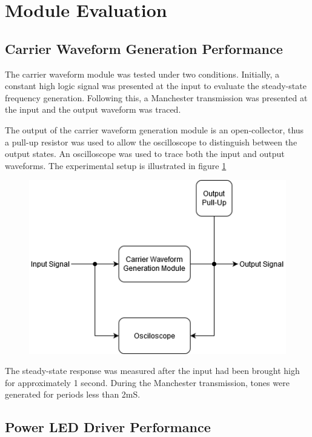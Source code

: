 


\section{Module Evaluation}

\subsection{Carrier Waveform Generation Performance}
The carrier waveform module was tested under two conditions. Initially, a constant high logic signal was presented at the input to evaluate the steady-state frequency generation. Following this, a Manchester transmission was presented at the input and the output waveform was traced.

The output of the carrier waveform generation module is an open-collector, thus a pull-up resistor was used to allow the oscilloscope to distinguish between the output states. An oscilloscope was used to trace both the input and output waveforms. The experimental setup is illustrated in figure \ref{fig:carrier_generation_module_experiment_setup}

\begin{figure}[H]
	\centering
	\includegraphics[width=.5\linewidth]{figures/experimentation/carrier_generation_module_experiment.png}
	\label{fig:carrier_generation_module_experiment_setup}
\end{figure}

The steady-state response was measured after the input had been brought high for approximately 1 second. During the Manchester transmission, tones were generated for periods less than 2mS.





\subsection{Power LED Driver Performance}


